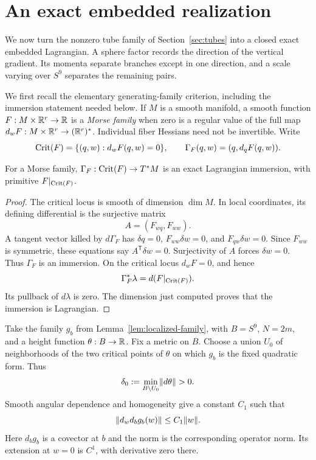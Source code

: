 \section{An exact embedded realization}\label{sec:embedding}

We now turn the nonzero tube family of Section~\ref{sec:tubes} into a
closed exact embedded Lagrangian. A sphere factor records the direction
of the vertical gradient. Its momenta separate branches except in one
direction, and a scale varying over $S^9$ separates the remaining pairs.

We first recall the elementary generating-family criterion, including the immersion statement needed below. If $M$ is a smooth manifold, a smooth function $F:M\times\mathbb R^r\to\mathbb R$ is a \emph{Morse family} when zero is a regular value of the full map $d_wF:M\times\mathbb R^r\to(\mathbb R^r)^*$. Individual fiber Hessians need not be invertible. Write
\[
 \operatorname{Crit}(F)=\{(q,w):d_wF(q,w)=0\},\qquad
 \Gamma_F(q,w)=(q,d_qF(q,w)).
\]

\begin{lemma}\label{lem:generating-map}
For a Morse family, $\Gamma_F:\operatorname{Crit}(F)\to T^*M$ is an exact Lagrangian immersion, with primitive $F|_{\operatorname{Crit}(F)}$.
\end{lemma}

\begin{proof}
The critical locus is smooth of dimension $\dim M$. In local coordinates, its defining differential is the surjective matrix
\[
 A=(F_{wq},F_{ww}).
\]
A tangent vector killed by $d\Gamma_F$ has $\delta q=0$, $F_{ww}\delta w=0$, and $F_{qw}\delta w=0$. Since $F_{ww}$ is symmetric, these equations say $A^{\mathsf T}\delta w=0$. Surjectivity of $A$ forces $\delta w=0$. Thus $\Gamma_F$ is an immersion. On the critical locus $d_wF=0$, and hence
\[
 \Gamma_F^*\lambda=d(F|_{\operatorname{Crit}(F)}).
\]
Its pullback of $d\lambda$ is zero. The dimension just computed proves that the immersion is Lagrangian.
\end{proof}

Take the family $g_b$ from Lemma~\ref{lem:localized-family}, with $B=S^9$, $N=2m$, and a height function $\theta:B\to\mathbb R$. Fix a metric on $B$. Choose a union $U_0$ of neighborhoods of the two critical points of $\theta$ on which $g_b$ is the fixed quadratic form. Thus
\[
 \delta_0:=\min_{B\setminus U_0}\lVert d\theta\rVert>0.
\]
Smooth angular dependence and homogeneity give a constant $C_1$ such that
\begin{equation}\label{eq:mixed-derivative-bound}
 \lVert d_wd_bg_b(w)\rVert\leq C_1\lVert w\rVert.
\end{equation}
Here $d_bg_b$ is a covector at $b$ and the norm is the corresponding operator norm. Its extension at $w=0$ is $C^1$, with derivative zero there.

